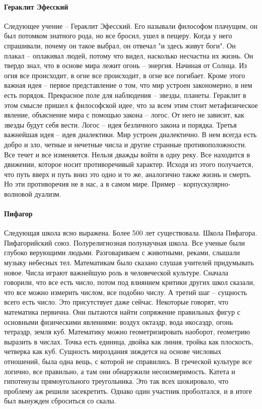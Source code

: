 \documentclass[a4paper, 12pt]{article}
\begin{document}
\paragraph{Гераклит Эфесский}
Следующее учение -- Гераклит Эфесский. Его называли философом плачущим, он был потомком знатного рода, но все бросил, ушел в пещеру. Когда у него спрашивали, почему он такое выбрал, он отвечал "и здесь живут боги". Он плакал -- оплакивал людей, потому что видел, насколько несчастна их жизнь. Он твердо знал, что в основе мира лежит огонь -- энергия. Начиная от Солнца. Из огня все происходит, в огне все происходит, в огне все погибает. Кроме этого важная идея -- первое представление о том, что мир устроен закономерно, в нем есть порядок. Прекрасное поле для наблюдения -- звезды, планеты. Гераклит в этом смысле пришел к философской идее, что за всем этим стоит метафизическое явление, объяснение мира с помощью закона -- логос. От него не зависит, как звезды будут себя вести. Логос -- идея безличного закона и порядка. Третья важнейшая идея -- идея диалектики. Мир устроен диалектично. В нем всегда есть добро и зло, четные и нечетные числа и другие странные противоположности. Все течет и все изменяется. Нельзя дважды войти в одну реку. Все находится в движении, которое носит противоречивый характер. Исходя из этого получается, что путь вверх и путь вниз это одно и то же, аналогично также жизнь и смерть. Но эти противоречия не в нас, а в самом мире. Пример -- корпускулярно-волновой дуализм. 

\paragraph{Пифагор}
Следующая школа ясно выражена. Более 500 лет существовала. Школа Пифагора. Пифагорийский союз. Полурелигиозная полунаучная школа. Все ученые были глубоко верующими людьми. Разговариваем с животными, реками, слышали музыку небесных тел. Математикам было сказано слушая учителей придумывать новое. Числа играют важнейшую роль в человеческой культуре. Сначала говорили, что все есть число, потом под влиянием критики других школ сказали, что все можно измерить числом, все подобно числу. А третий шаг -- сущность всего есть число. Это присутствует даже сейчас. Некоторые говорят, что математика первична. Они пытаются найти сопряжение правильных фигур с основными физическими явлениями: воздух октаэдр, вода икосаэдр, огонь тетраэдр, земля куб. Математику можно геометризировать наоборот, геометрию выразить в числах. Точка есть единица, двойка как линия, тройка как плоскость, четверка как куб. Сущность мироздания зиждется на основе числовых отношений, была одна вещь, с которой не справились. В греческой культуре все логично, все правильно, а там они обнаружили несоизмеримость. Катета и гипотенузы прямоугольного треугольника. Это так всех шокировало, что проблему аж решили засекретить. Однако один участник проболтался, и в итоге был вынужден сброситься со скалы.
\end{document}
